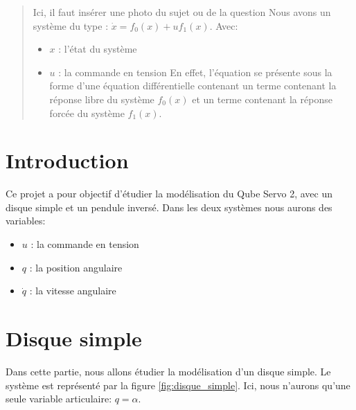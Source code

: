 \begin{abstract}
    Ici, il faut insérer une photo du sujet ou de la question
    Nous avons un système du type : $\dot{x} = f_0(x) + uf_1(x)$.
    Avec:
    \begin{itemize}
        \item $x$ : l'état du système
        \item $u$ : la commande en tension
    En effet, l'équation se présente sous la forme d'une équation différentielle contenant un terme contenant la réponse libre du système $f_0(x)$ et un terme contenant la réponse forcée du système $f_1(x)$.
    \end{itemize}
\end{abstract}

\section{Introduction}
Ce projet a pour objectif d'étudier la modélisation du Qube Servo 2, avec un disque simple et un pendule inversé.
Dans les deux systèmes nous aurons des variables:
    \begin{itemize}
        \item $u$ : la commande en tension
        \item $q$ : la position angulaire
        \item $\dot{q}$ : la vitesse angulaire

    \end{itemize}



\section{Disque simple}
Dans cette partie, nous allons étudier la modélisation d'un disque simple. Le système est représenté par la figure \ref{fig:disque_simple}.
Ici, nous n'aurons qu'une seule variable articulaire: $q = \alpha$.




